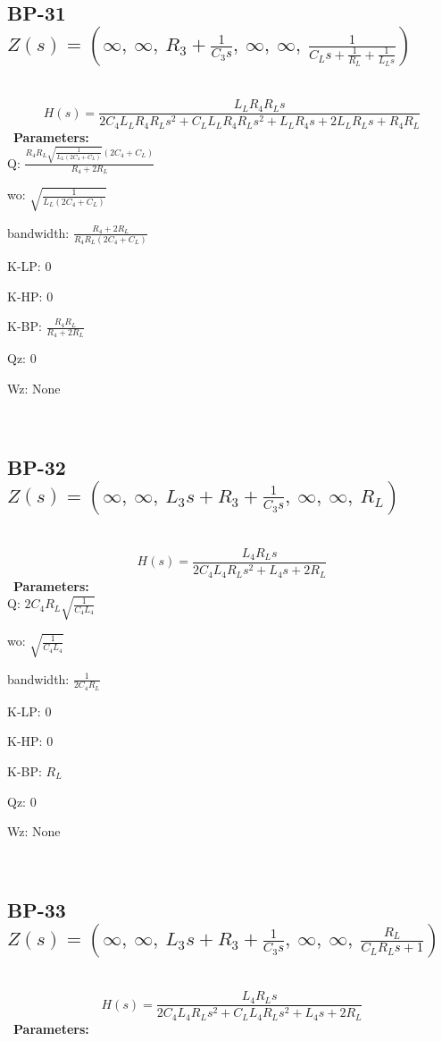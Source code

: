 \documentclass{article}
\begin{document}
\ 

\subsection{BP-31 $Z(s) = \left( \infty, \  \infty, \  R_{3} + \frac{1}{C_{3} s}, \  \infty, \  \infty, \  \frac{1}{C_{L} s + \frac{1}{R_{L}} + \frac{1}{L_{L} s}}\right)$ } \ 
\textbf{\[H(s) = \frac{L_{L} R_{4} R_{L} s}{2 C_{4} L_{L} R_{4} R_{L} s^{2} + C_{L} L_{L} R_{4} R_{L} s^{2} + L_{L} R_{4} s + 2 L_{L} R_{L} s + R_{4} R_{L}}\] } \ 
\textbf{Parameters:}\\ 

Q: $\frac{R_{4} R_{L} \sqrt{\frac{1}{L_{L} \left(2 C_{4} + C_{L}\right)}} \left(2 C_{4} + C_{L}\right)}{R_{4} + 2 R_{L}}$\ 

wo: $\sqrt{\frac{1}{L_{L} \left(2 C_{4} + C_{L}\right)}}$\ 

bandwidth: $\frac{R_{4} + 2 R_{L}}{R_{4} R_{L} \left(2 C_{4} + C_{L}\right)}$\ 

K-LP: $0$\ 

K-HP: $0$\ 

K-BP: $\frac{R_{4} R_{L}}{R_{4} + 2 R_{L}}$\ 

Qz: $0$\ 

Wz: $\text{None}$\ 

\ 

\subsection{BP-32 $Z(s) = \left( \infty, \  \infty, \  L_{3} s + R_{3} + \frac{1}{C_{3} s}, \  \infty, \  \infty, \  R_{L}\right)$ } \ 
\textbf{\[H(s) = \frac{L_{4} R_{L} s}{2 C_{4} L_{4} R_{L} s^{2} + L_{4} s + 2 R_{L}}\] } \ 
\textbf{Parameters:}\\ 

Q: $2 C_{4} R_{L} \sqrt{\frac{1}{C_{4} L_{4}}}$\ 

wo: $\sqrt{\frac{1}{C_{4} L_{4}}}$\ 

bandwidth: $\frac{1}{2 C_{4} R_{L}}$\ 

K-LP: $0$\ 

K-HP: $0$\ 

K-BP: $R_{L}$\ 

Qz: $0$\ 

Wz: $\text{None}$\ 

\ 

\subsection{BP-33 $Z(s) = \left( \infty, \  \infty, \  L_{3} s + R_{3} + \frac{1}{C_{3} s}, \  \infty, \  \infty, \  \frac{R_{L}}{C_{L} R_{L} s + 1}\right)$ } \ 
\textbf{\[H(s) = \frac{L_{4} R_{L} s}{2 C_{4} L_{4} R_{L} s^{2} + C_{L} L_{4} R_{L} s^{2} + L_{4} s + 2 R_{L}}\] } \ 
\textbf{Parameters:}\\ 
\end{document}
